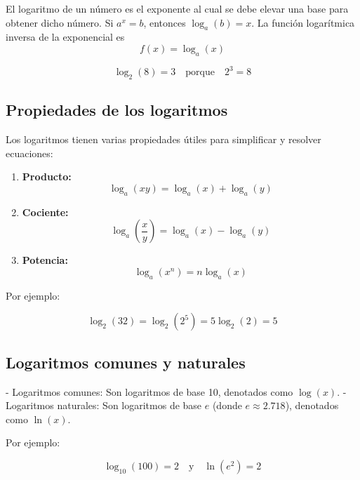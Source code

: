     El logaritmo de un número es el exponente al cual se debe elevar una base para obtener dicho número. Si \( a^x = b \), entonces \( \log_a(b) = x \). La función logarítmica inversa de la exponencial es
    \begin{equation}
        f(x) = \log_a(x)
    \end{equation} 
    \begin{example}
        \[\log_2(8) = 3 \quad \text{porque} \quad 2^3 = 8\]
    \end{example}
    
    \subsection{Propiedades de los logaritmos}
    
    Los logaritmos tienen varias propiedades útiles para simplificar y resolver ecuaciones:
    
    \begin{enumerate}
        \item \textbf{Producto:} \begin{equation}
            \log_a(xy) = \log_a(x) + \log_a(y)
        \end{equation}
        \item \textbf{Cociente:} \begin{equation}
            \log_a\left(\frac{x}{y}\right) = \log_a(x) - \log_a(y)
        \end{equation}
        \item \textbf{Potencia:} \begin{equation}
            \log_a(x^n) = n\log_a(x)
        \end{equation}
        
    \end{enumerate}
    Por ejemplo:
    
    \[
    \log_2(32) = \log_2(2^5) = 5\log_2(2) = 5
    \]
    
    \subsection{Logaritmos comunes y naturales}
    
    - Logaritmos comunes: Son logaritmos de base 10, denotados como \( \log(x) \).
    - Logaritmos naturales: Son logaritmos de base \( e \) (donde \( e \approx 2.718 \)), denotados como \( \ln(x) \).
    
    Por ejemplo:
    
    \[
    \log_{10}(100) = 2 \quad \text{y} \quad \ln(e^2) = 2
    \]
    
